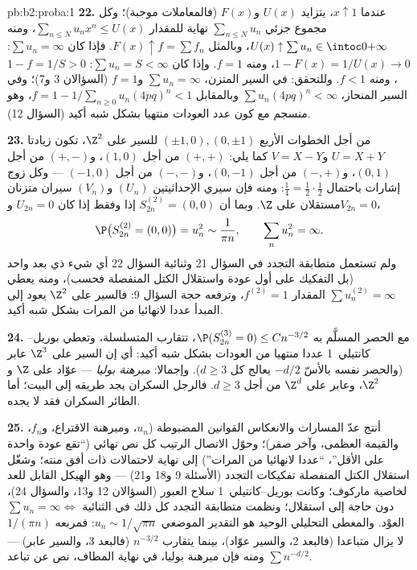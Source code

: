 \begin{solution}{pb:b2:proba:1}
\textbf{22.} عندما $x \uparrow 1$، يتزايد $U(x)$ و$F(x)$ (فالمعاملات
موجبة)؛ وكل مجموع جزئي $\sum_{n\leq
N}u_n$ نهاية للمقدار $\sum_{n\leq N}u_nx^n \leq U(x)$، ومنه $U(x) \uparrow \sum u_n \in \intoc0{+\infty}$،
وبالمثل $F(x) \uparrow f = \sum f_n$. فإذا كان $\sum u_n = \infty$: $1 -
F(x) = 1/U(x) \to 0$، ومنه $f = 1$. وإذا كان
$\sum u_n = S < \infty$: $1 - f = 1/S > 0$، ومنه $f < 1$. وللتحقق: في السير المتزن، $\sum u_n =
\infty$
و$f = 1$ (السؤالان 3 و7)؛ وفي السير المنحاز، $\sum
u_n(4pq)^n < \infty$ وبالمقابل
$f = 1 -
1/\sum_{n\geq0}u_n(4pq)^n < 1$، وهو منسجم مع كون عدد العودات منتهيا بشكل شبه أكيد (السؤال
12).

\textbf{23.} من أجل الخطوات الأربع $(\pm1, 0), (0, \pm1)$ للسير على $\Z^2$، تكون
زيادتا $U = X + Y$ و$V = X - Y$ كما يلي: $(+,+)$ من أجل $(1,0)$، و$(+,-)$ من
أجل $(0,1)$، و$(-,+)$ من أجل $(0,-1)$، و$(-,-)$ من أجل $(-1,0)$ ---
وكل زوج إشارات باحتمال $\frac14 = \frac12\cdot\frac12$: ومنه فإن سيري الإحداثيتين $(U_n)$
و$(V_n)$ سيران متزنان مستقلان على $\Z$. وبما أن $S^{(2)}_{2n} = (0,0)$ إذا وفقط
إذا كان $U_{2n} = 0$ و$V_{2n} = 0$،
\[
\P\bigl(S^{(2)}_{2n} = (0,0)\bigr) = u_n^2 \sim \frac1{\pi
n}, \qquad \sum_nu_n^2 = \infty .
\]
ولم تستعمل متطابقة التجدد في السؤال 21 وثنائية السؤال 22 أي شيء ذي
بعد واحد (بل التفكيك على أول عودة واستقلال الكتل المنفصلة فحسب)،
ومنه يعطي $\sum u_n^{(2)} = \infty$ المقدار $f^{(2)} =
1$، وترفعه حجة السؤال 9: فالسير على
$\Z^2$ يعود إلى المبدأ عددا لانهائيا من المرات بشكل شبه أكيد.

\textbf{24.} مع الحصر المسلَّم به $\P(S^{(3)}_{2n} = 0)
\leq Cn^{-3/2}$، تتقارب المتسلسلة، وتعطي
بوريل--كانتيلي~1 عددا منتهيا من العودات بشكل شبه أكيد: أي إن السير
على $\Z^3$ عابر (والحصر نفسه بالأسّ $-d/2$ يعالج كل $d \geq 3$).
وإجمالا: \emph{مبرهنة بوليا} ---  عوّاد على
$\Z$ و$\Z^2$، وعابر على $\Z^d$ من أجل $d \geq 3$. فالرجل السكران
يجد طريقه إلى البيت؛ أما الطائر السكران فقد لا يجده.

\textbf{25.} أنتج عدّ المسارات والانعكاس القوانين المضبوطة ($u_n$،
ومبرهنة الاقتراع، و$f_n$، والقيمة العظمى، وآخر صفر)؛ وحوّل
الاتصال الرتيب كل نص نهائي (``تقع عودة واحدة على الأقل''، ``عددا
لانهائيا من المرات'') إلى نهاية لاحتمالات ذات أفق منته؛ وشغّل استقلال
الكتل المنفصلة تفكيكات التجدد (الأسئلة 9 و18 و21) --- وهو الهيكل
القابل للعد لخاصية ماركوف؛ وكانت بوريل--كانتيلي~1 سلاح العبور
(السؤالان 12 و13، والسؤال 24)، دون حاجة إلى استقلال؛ ونظمت متطابقة
التجدد كل ذلك في الثنائية $\sum u_n = \infty \iff$ العوْد. والمعطى التحليلي الوحيد هو
التقدير الموضعي $u_n \sim 1/\sqrt{\pi
n}$: فمربعه $1/(\pi n)$ لا يزال متباعدا (فالبعد
$2$، والسير عوّاد)، بينما يتقارب $n^{-3/2}$ (فالبعد $3$، والسير
عابر) --- ومنه فإن مبرهنة بوليا، في نهاية المطاف، نص عن تباعد $\sum n^{-d/2}$.
\end{solution}
